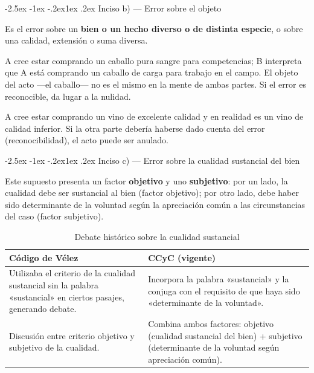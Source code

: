 \documentclass[12pt,oneside]{book}
\makeatletter
\renewcommand\subsection{\@startsection{subsection}{2}{\z@}%
  {-2.5ex \@plus -1ex \@minus -.2ex}{1ex \@plus .2ex}%
  {\normalfont\normalsize\bfseries}}
\makeatother
\begin{document}
\subsection{Inciso b) --- Error sobre el objeto}

Es el error sobre un \textbf{bien o un hecho diverso o de distinta especie}, o sobre una calidad, extensión o suma diversa.

\begin{ejemplo}
A cree estar comprando un caballo pura sangre para competencias; B interpreta que A está comprando un caballo de carga para trabajo en el campo. El objeto del acto ---el caballo--- no es el mismo en la mente de ambas partes. Si el error es reconocible, da lugar a la nulidad.
\end{ejemplo}

\begin{ejemplo}
A cree estar comprando un vino de excelente calidad y en realidad es un vino de calidad inferior. Si la otra parte debería haberse dado cuenta del error (reconocibilidad), el acto puede ser anulado.
\end{ejemplo}

\subsection{Inciso c) --- Error sobre la cualidad sustancial del bien}

Este supuesto presenta un factor \textbf{objetivo} y uno \textbf{subjetivo}: por un lado, la cualidad debe ser sustancial al bien (factor objetivo); por otro lado, debe haber sido determinante de la voluntad según la apreciación común a las circunstancias del caso (factor subjetivo).

\begin{table}[H]
\centering
\begin{tabularx}{\textwidth}{>{\raggedright\arraybackslash}X >{\raggedright\arraybackslash}X}
\toprule
\textbf{Código de Vélez} & \textbf{CCyC (vigente)} \\
\midrule
Utilizaba el criterio de la cualidad sustancial sin la palabra «sustancial» en ciertos pasajes, generando debate. & Incorpora la palabra «sustancial» y la conjuga con el requisito de que haya sido «determinante de la voluntad». \\[4pt]
Discusión entre criterio objetivo y subjetivo de la cualidad. & Combina ambos factores: objetivo (cualidad sustancial del bien) + subjetivo (determinante de la voluntad según apreciación común). \\
\bottomrule
\end{tabularx}
\caption{Debate histórico sobre la cualidad sustancial}
\end{table}
\end{document}
